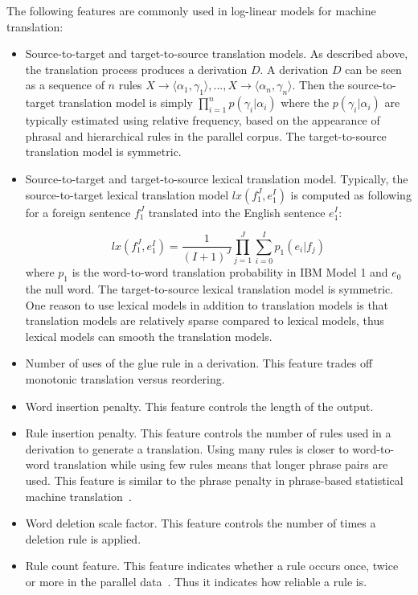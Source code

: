     The following features are commonly used in log-linear models for machine translation:
%    
    \begin{itemize}
      \item Source-to-target and target-to-source translation models. As described above, the 
        translation process produces a derivation $D$. A derivation $D$ can be seen
        as a sequence of $n$ rules 
        $X \rightarrow \langle \alpha_1, \gamma_1 \rangle, ..., X \rightarrow \langle \alpha_n, \gamma_n \rangle$.
        Then the source-to-target translation model is simply $\prod_{i=1}^n p(\gamma_i|\alpha_i)$ where
        the $p(\gamma_i|\alpha_i)$ are typically estimated using relative frequency, based on the appearance 
        of phrasal and hierarchical rules in the parallel corpus.
        The target-to-source 
        translation model is symmetric.
      \item Source-to-target and target-to-source lexical translation model. Typically, the source-to-target lexical translation
        model $lx(f_1^J,e_1^I)$ is computed as following for a foreign sentence $f_1^J$ translated into the English sentence $e_1^I$:

        \begin{equation} \label{eq:lexfeature}
          lx(f_1^J,e_1^I) = \frac{1}{(I+1)^J}\prod_{j=1}^{J} \sum_{i=0}^{I} p_1(e_i|f_j)
        \end{equation}
%
        where $p_1$ is the word-to-word translation probability in IBM Model 1 and $e_0$ the null word. The target-to-source lexical translation model is symmetric. One reason to use lexical models in addition to translation models is that translation models are relatively sparse compared
        to lexical models, thus lexical models can smooth the translation models.

      \item Number of uses of the glue rule in a derivation. This feature trades off monotonic translation versus reordering.
      \item Word insertion penalty. This feature controls the length of the output.
      \item Rule insertion penalty. This feature controls the number of rules used in a derivation to generate a translation.
        Using many rules is closer to word-to-word
        translation while using few rules means that longer phrase pairs are used. This feature is similar to the phrase penalty in phrase-based
        statistical machine translation~\citep{koehn:2010:book}.
      \item Word deletion scale factor. This feature controls the number of times a deletion rule is applied.
      \item Rule count feature. This feature indicates 
        whether a rule occurs once, twice or more in the parallel data~\citep{bender:07}. Thus it indicates how reliable a rule is.
    \end{itemize}


